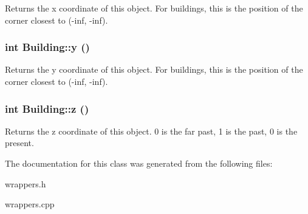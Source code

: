Returns the x coordinate of this object. For buildings, this is the position of the corner closest to (-inf, -inf). \hypertarget{classBuilding_751e37f8a295f08e39b79b5e1632cd38}{
\subsubsection[{y}]{\setlength{\rightskip}{0pt plus 5cm}int Building::y ()}}
\label{classBuilding_751e37f8a295f08e39b79b5e1632cd38}


Returns the y coordinate of this object. For buildings, this is the position of the corner closest to (-inf, -inf). \hypertarget{classBuilding_68341589a1fe809b38c54dc3415da183}{
\subsubsection[{z}]{\setlength{\rightskip}{0pt plus 5cm}int Building::z ()}}
\label{classBuilding_68341589a1fe809b38c54dc3415da183}


Returns the z coordinate of this object. 0 is the far past, 1 is the past, 0 is the present. 

The documentation for this class was generated from the following files:\begin{CompactItemize}
\item 
wrappers.h\item 
wrappers.cpp\end{CompactItemize}
